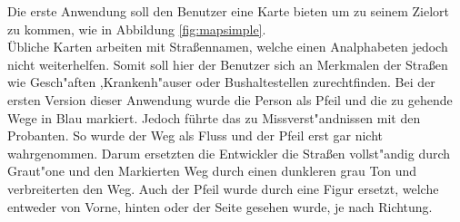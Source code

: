 Die erste Anwendung soll den Benutzer eine Karte bieten um zu seinem Zielort zu kommen, wie in Abbildung \ref{fig:mapsimple}.\\
Übliche Karten arbeiten mit Straßennamen, welche einen Analphabeten jedoch nicht weiterhelfen. Somit soll hier der Benutzer sich an Merkmalen der Straßen wie Gesch"aften ,Krankenh"auser oder Bushaltestellen zurechtfinden.
Bei der ersten Version dieser Anwendung wurde die Person als Pfeil und die zu gehende Wege in Blau markiert. Jedoch führte das zu Missverst"andnissen mit den Probanten. So wurde der Weg als Fluss und der Pfeil erst gar nicht wahrgenommen. Darum ersetzten die Entwickler die Straßen vollst"andig durch Graut"one und den Markierten Weg durch einen dunkleren grau Ton und verbreiterten den Weg.
Auch der Pfeil wurde durch eine Figur ersetzt, welche entweder von Vorne, hinten oder der Seite gesehen wurde, je nach Richtung.


